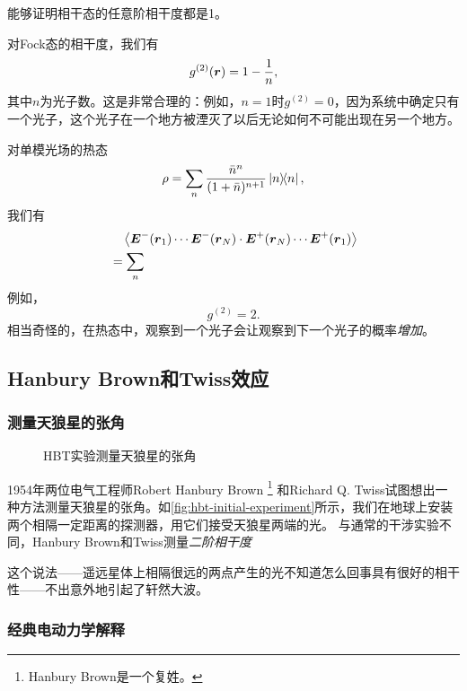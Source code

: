 能够证明相干态的任意阶相干度都是1。

对Fock态的相干度，我们有
\begin{equation}
    g^{(2)}(\vb*{r}) = 1 - \frac{1}{n},
\end{equation}
其中$n$为光子数。这是非常合理的：例如，$n=1$时$g^{(2)} = 0$，因为系统中确定只有一个光子，这个光子在一个地方被湮灭了以后无论如何不可能出现在另一个地方。

对单模光场的热态
\begin{equation}
    \rho = \sum_n \frac{\bar{n}^n}{(1 + \bar{n})^{n+1}} \dyad{n},
\end{equation}
我们有
\[
    \begin{aligned}
        &\quad \expval{\vb*{E}^-(\vb*{r}_1) \cdots \vb*{E}^-(\vb*{r}_N) \cdot \vb*{E}^+(\vb*{r}_N) \cdots \vb*{E}^+(\vb*{r}_1)} \\
        &= \sum_n 
    \end{aligned}
\]
例如，
\begin{equation}
    g^{(2)} = 2.
\end{equation}
相当奇怪的，在热态中，观察到一个光子会让观察到下一个光子的概率\emph{增加}。

\subsection{Hanbury Brown和Twiss效应}

\subsubsection{测量天狼星的张角}

\begin{figure}
    \centering
    
    \caption{HBT实验测量天狼星的张角}
    \label{fig:hbt-initial-experiment}
\end{figure}

1954年两位电气工程师Robert Hanbury Brown%
\footnote{
    Hanbury Brown是一个复姓。
}%
和Richard Q. Twiss试图想出一种方法测量天狼星的张角。如\autoref{fig:hbt-initial-experiment}所示，我们在地球上安装两个相隔一定距离的探测器，用它们接受天狼星两端的光。
与通常的干涉实验不同，Hanbury Brown和Twiss测量\emph{二阶相干度}

这个说法——遥远星体上相隔很远的两点产生的光不知道怎么回事具有很好的相干性——不出意外地引起了轩然大波。

\subsubsection{经典电动力学解释}

